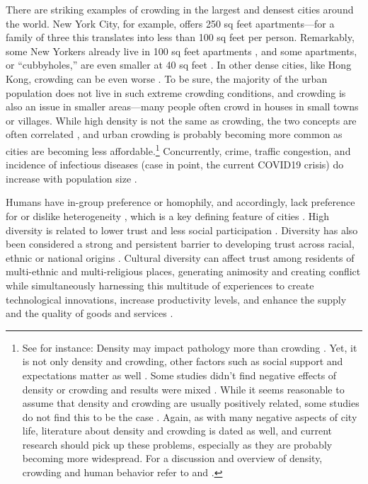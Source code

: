 \documentclass[11pt, letterpaper]{article}
\begin{document}
\begin{spacing}{1.4}
There are striking examples of crowding in the largest and densest cities around the world. New York City, for example, offers 250 sq feet apartments---for a family of three this translates into less than 100 sq feet per person. Remarkably, some New Yorkers already live in 100 sq feet apartments \citep{abc,yoneda,dailynews}, and some apartments, or ``cubbyholes,'' are even smaller at 40 sq feet \citep{newyorktimes}. In other dense cities, like Hong Kong, crowding can be even worse \citep{newyorktimes2}. To
  be sure, the majority of the urban population does not live in such extreme crowding conditions, and crowding is also an issue in smaller areas---many people often crowd in houses in small towns or villages.
  While high density is not the same as crowding, the two concepts are often
  correlated \citep{meyer13}, and urban crowding is probably becoming more
  common  as cities are becoming less affordable.\footnote{See for instance: \citet{misraCL15oct6,floridaCL18apr11,weinbergCL16aug11,solariMISC19apr24,schuetzMISC19may7,kotkin_db_mar20_13}
%    
Density may impact pathology more than crowding \citep{levy1974effects}. Yet, it is not only density and crowding, other  factors such as social support and expectations matter as well \citep{cassel2017health,chan78}. Some
  studies didn't find negative effects of density or crowding and results were  mixed \citep{collette1976urban}. While it seems  reasonable to assume that density and crowding are usually positively related, some studies do not
  find  this to be the case \citep{webb1975meaning,rodgers1982density}. 
  Again, as with many negative aspects of city life, literature about density
  and crowding is dated as well, and current research should pick up these
  problems, especially as they are probably becoming more widespread.
%
For a discussion and overview of density, crowding and human behavior refer to \citet{boots1979population,choldin1978urban} and \citet{ramsden09}.} 
% 
Concurrently,  crime, traffic congestion, and incidence of infectious diseases ({case in point, the current COVID19 crisis}) do increase with population size \citep{bettencourt10,bettencourt10b,bettencourt07}.

Humans have in-group preference or homophily, and
accordingly, lack preference for or dislike heterogeneity
\citep{smith14,mcpherson01,bleidorn16,putnam07}, which is a key defining feature
of cities \citep{wirth38,amin06,thrift05}. High diversity is related to lower trust and less social participation \citep{alesina99,alesina00,luttmer01,alesina02,rodriguez2019does}.  
Diversity has also been considered a strong and persistent barrier to developing trust across racial, ethnic or national origins \citep{glaeser00}. Cultural diversity can affect trust among residents of multi-ethnic and multi-religious places, generating animosity and creating conflict while simultaneously harnessing this multitude of experiences to create technological innovations, increase productivity levels, and enhance the supply and the quality of goods and services \citet{rodriguez2019does}. 


\end{spacing}
\end{document}
